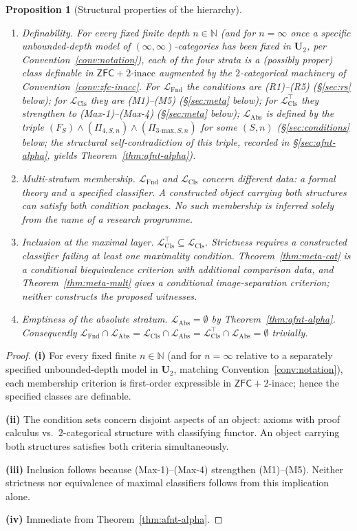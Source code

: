 \documentclass[11pt]{article}
\theoremstyle{plain}
\newtheorem{proposition}[theorem]{Proposition}
\theoremstyle{definition}
\newcommand{\LFnd}{\mathcal{L}_{\mathrm{Fnd}}}
\newcommand{\LCls}{\mathcal{L}_{\mathrm{Cls}}}
\newcommand{\LClsMax}{\mathcal{L}_{\mathrm{Cls}}^{\top}}
\newcommand{\LAbs}{\mathcal{L}_{\mathrm{Abs}}}
\newcommand{\ZFC}{\mathsf{ZFC}}
\begin{document}
\begin{proposition}[Structural properties of the hierarchy]\label{prop:level-structure}
\begin{enumerate}
\item[\textbf{(i)}] \emph{Definability.} For every fixed finite depth $n \in \mathbb{N}$ (and for $n = \infty$ once a specific unbounded-depth model of $(\infty, \infty)$-categories has been fixed in $\mathbf{U}_2$, per Convention~\ref{conv:notation}), each of the four strata is a (possibly proper) class definable in $\ZFC + 2\text{-inacc}$ augmented by the $2$-categorical machinery of Convention~\ref{conv:zfc-inacc}. For $\LFnd$ the conditions are (R1)--(R5) (\S\ref{sec:rs} below); for $\LCls$ they are (M1)--(M5) (\S\ref{sec:meta} below); for $\LClsMax$ they strengthen to (Max-1)--(Max-4) (\S\ref{sec:meta} below); $\LAbs$ is defined by the triple $(F_S) \wedge (\Pi_{4, S, n}) \wedge (\Pi_{3\text{-max}, S, n})$ for some $(S, n)$ (\S\ref{sec:conditions} below; the structural self-contradiction of this triple, recorded in \S\ref{sec:afnt-alpha}, yields Theorem~\ref{thm:afnt-alpha}).
\item[\textbf{(ii)}] \emph{Multi-stratum membership.} $\LFnd$ and $\LCls$ concern different data: a formal theory and a specified classifier. A constructed object carrying both structures can satisfy both condition packages. No such membership is inferred solely from the name of a research programme.
\item[\textbf{(iii)}] \emph{Inclusion at the maximal layer.} $\LClsMax\subseteq\LCls$. Strictness requires a constructed classifier failing at least one maximality condition. Theorem~\ref{thm:meta-cat} is a conditional biequivalence criterion with additional comparison data, and Theorem~\ref{thm:meta-mult} gives a conditional image-separation criterion; neither constructs the proposed witnesses.
\item[\textbf{(iv)}] \emph{Emptiness of the absolute stratum.} $\LAbs = \emptyset$ by Theorem~\ref{thm:afnt-alpha}. Consequently $\LFnd \cap \LAbs = \LCls \cap \LAbs = \LClsMax \cap \LAbs = \emptyset$ trivially.
\end{enumerate}
\end{proposition}

\begin{proof}
\textbf{(i)} For every fixed finite $n \in \mathbb{N}$ (and for $n = \infty$ relative to a separately specified unbounded-depth model in $\mathbf{U}_2$, matching Convention~\ref{conv:notation}), each membership criterion is first-order expressible in $\ZFC + 2\text{-inacc}$; hence the specified classes are definable.

\textbf{(ii)} The condition sets concern disjoint aspects of an object: axioms with proof calculus vs.\ $2$-categorical structure with classifying functor. An object carrying both structures satisfies both criteria simultaneously.

\textbf{(iii)} Inclusion follows because (Max-1)--(Max-4) strengthen (M1)--(M5). Neither strictness nor equivalence of maximal classifiers follows from this implication alone.

\textbf{(iv)} Immediate from Theorem~\ref{thm:afnt-alpha}.
\end{proof}
\end{document}
